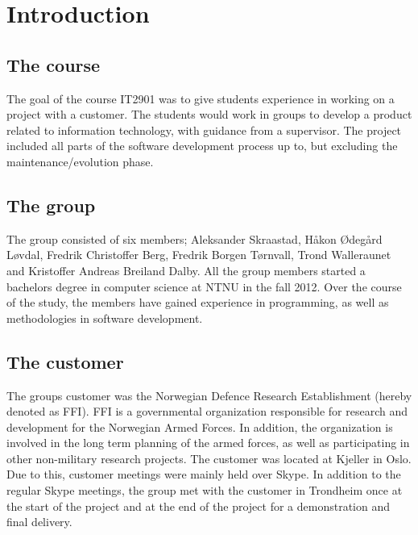
\chapter{Introduction}
\label{ch:introduction}

\section{The course}
\label{sec:introduction-the_course}

The goal of the course IT2901 was to give students experience in working on a project with a customer. The students would work in groups to develop a product related to information technology, with guidance from a supervisor. The project included all parts of the software development process up to, but excluding the maintenance/evolution phase.

\section{The group}
\label{sec:introduction-the_group}

The group consisted of six members; Aleksander Skraastad, Håkon Ødegård Løvdal, Fredrik Christoffer Berg, Fredrik Borgen Tørnvall, Trond Walleraunet and Kristoffer Andreas Breiland Dalby. All the group members started a bachelors degree in computer science at NTNU in the fall 2012. Over the course of the study, the members have gained experience in programming, as well as methodologies in software development.

\section{The customer}
\label{sec:introduction-the_customer}

The groups customer was the Norwegian Defence Research Establishment (hereby denoted as FFI). FFI is a governmental organization responsible for research and development for the Norwegian Armed Forces. In addition, the organization is involved in the long term planning of the armed forces, as well as participating in other non-military research projects. The customer was located at Kjeller in Oslo. Due to this, customer meetings were mainly held over Skype. In addition to the regular Skype meetings, the group met with the customer in Trondheim once at the start of the project and at the end of the project for a demonstration and final delivery.

